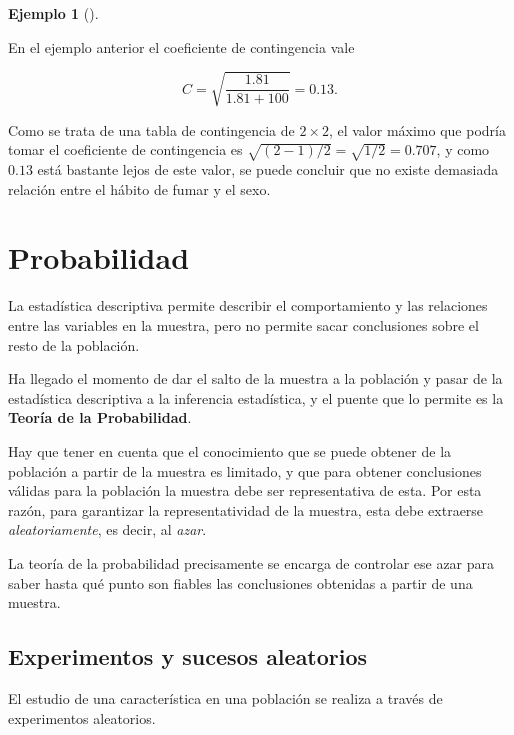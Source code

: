 \documentclass[
  a4paper,
]{scrreport}
\theoremstyle{plain}
\theoremstyle{definition}
\newtheorem{example}{Ejemplo}[chapter]
\theoremstyle{definition}
\theoremstyle{remark}
\begin{document}
\begin{example}[]\protect\hypertarget{exm-coeficiente-contingencia}{}\label{exm-coeficiente-contingencia}

En el ejemplo anterior el coeficiente de contingencia vale

\[
C = \sqrt{\frac{1.81}{1.81+100}} = 0.13.
\]

Como se trata de una tabla de contingencia de \(2\times 2\), el valor
máximo que podría tomar el coeficiente de contingencia es
\(\sqrt{(2-1)/2}=\sqrt{1/2}=0.707\), y como \(0.13\) está bastante lejos
de este valor, se puede concluir que no existe demasiada relación entre
el hábito de fumar y el sexo.

\end{example}


\chapter{Probabilidad}\label{probabilidad}

La estadística descriptiva permite describir el comportamiento y las
relaciones entre las variables en la muestra, pero no permite sacar
conclusiones sobre el resto de la población.

Ha llegado el momento de dar el salto de la muestra a la población y
pasar de la estadística descriptiva a la inferencia estadística, y el
puente que lo permite es la \textbf{Teoría de la Probabilidad}.

Hay que tener en cuenta que el conocimiento que se puede obtener de la
población a partir de la muestra es limitado, y que para obtener
conclusiones válidas para la población la muestra debe ser
representativa de esta. Por esta razón, para garantizar la
representatividad de la muestra, esta debe extraerse
\emph{aleatoriamente}, es decir, al \emph{azar}.

La teoría de la probabilidad precisamente se encarga de controlar ese
azar para saber hasta qué punto son fiables las conclusiones obtenidas a
partir de una muestra.

\section{Experimentos y sucesos
aleatorios}\label{experimentos-y-sucesos-aleatorios}

El estudio de una característica en una población se realiza a través de
experimentos aleatorios.
\end{document}
